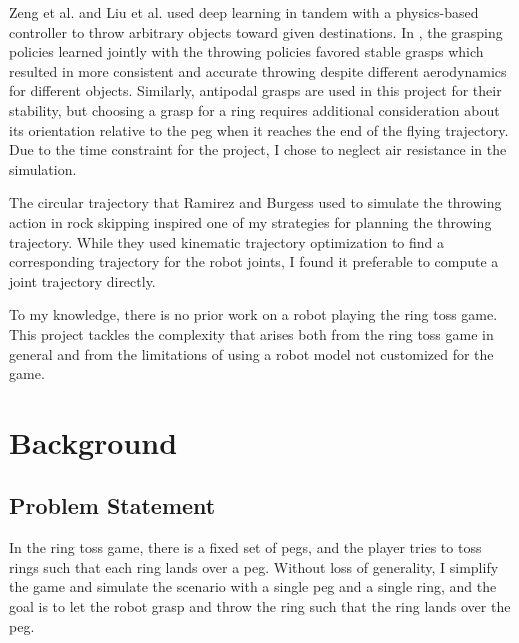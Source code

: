 \documentclass[conference]{IEEEtran}
\begin{document}
Zeng et al. \cite{zeng2020tossingbot} and Liu et al. \cite{liu2022solution} used deep learning in tandem with a physics-based controller to throw arbitrary objects toward given destinations. In \cite{zeng2020tossingbot}, the grasping policies learned jointly with the throwing policies favored stable grasps which resulted in more consistent and accurate throwing despite different aerodynamics for different objects. Similarly, antipodal grasps are used in this project for their stability, but choosing a grasp for a ring requires additional consideration about its orientation relative to the peg when it reaches the end of the flying trajectory. Due to the time constraint for the project, I chose to neglect air resistance in the simulation.

The circular trajectory that Ramirez and Burgess \cite{ramirez2023robotic} used to simulate the throwing action in rock skipping inspired one of my strategies for planning the throwing trajectory. While they used kinematic trajectory optimization to find a corresponding trajectory for the robot joints, I found it preferable to compute a joint trajectory directly.

To my knowledge, there is no prior work on a robot playing the ring toss game. This project tackles the complexity that arises both from the ring toss game in general and from the limitations of using a robot model not customized for the game.

\section{Background}
\subsection{Problem Statement}
In the ring toss game, there is a fixed set of pegs, and the player tries to toss rings such that each ring lands over a peg. Without loss of generality, I simplify the game and simulate the scenario with a single peg and a single ring, and the goal is to let the robot grasp and throw the ring such that the ring lands over the peg.
\end{document}
